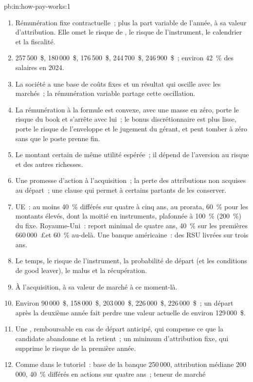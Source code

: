 \begin{solution}{pb:in:how-pay-works:1}
\begin{enumerate}
\item Rémunération fixe contractuelle~;  plus la part variable de l'année, à sa valeur d'attribution. Elle omet le risque de , le
risque de l'instrument, le calendrier et la fiscalité.
\item 257\,500~\$, 180\,000~\$, 176\,500~\$, 244\,700~\$, 246\,900~\$~; environ 42~\% des salaires en 2024.
\item La société a une base de coûts fixes et un résultat qui oscille avec les marchés~; la rémunération variable partage cette oscillation.
\item La rémunération à la formule est convexe, avec une masse en zéro, porte le risque du book et s'arrête avec lui~; le bonus discrétionnaire est plus lisse,
porte le risque de l'enveloppe et le jugement du gérant, et peut tomber à zéro sans que le poste prenne fin.
\item Le montant certain de même utilité espérée~; il dépend de l'aversion au risque et des autres richesses.
\item Une promesse d'action à l'acquisition~; la perte des attributions non acquises au départ~; une clause qui permet à certains partants de les conserver.
\item UE~: au moins 40~\% différés sur quatre à cinq ans, au prorata, 60~\% pour les montants élevés, dont la moitié en instruments,
plafonnée à 100~\% (200~\%) du fixe. Royaume-Uni~: report minimal de quatre ans, 40~\% sur les premières 660\,000~\pounds et 60~\% au-delà.
Une banque américaine~: des RSU livrées sur trois ans.
\item Le temps, le risque de l'instrument, la probabilité de départ (et les conditions de good leaver), le malus et la récupération.
\item À l'acquisition, à sa valeur de marché à ce moment-là.
\item Environ 90\,000~\$, 158\,000~\$, 203\,000~\$, 226\,000~\$, 226\,000~\$~; un départ après la deuxième année fait perdre une valeur actuelle de
environ 129\,000~\$.
\item Une , remboursable en cas de départ anticipé, qui compense ce que la candidate abandonne et la retient~; un
minimum d'attribution fixe, qui supprime le risque de la première année.
\item Comme dans le tutoriel~: base de la banque 250\,000, attribution médiane 200\,000, 40~\% différés en actions sur quatre ans~; teneur de marché

\end{enumerate}
\end{solution}
